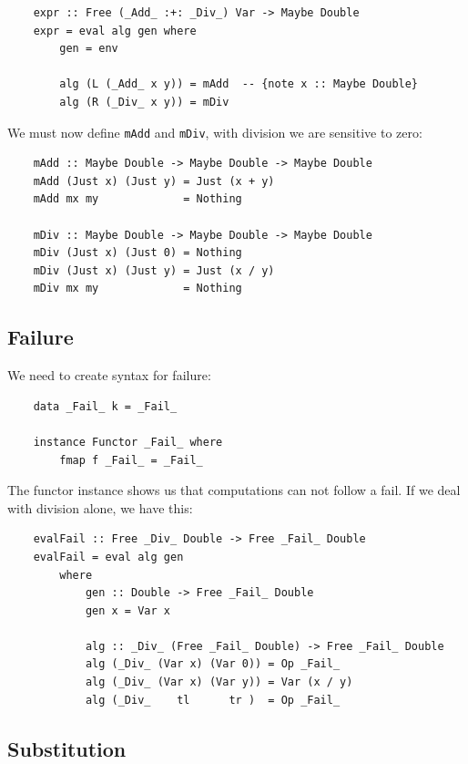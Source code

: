 \documentclass[a4paper,12pt]{article}
\theoremstyle{remark}
\begin{document}
\begin{lstlisting}
    expr :: Free (_Add_ :+: _Div_) Var -> Maybe Double
    expr = eval alg gen where
        gen = env

        alg (L (_Add_ x y)) = mAdd  -- {note x :: Maybe Double}
        alg (R (_Div_ x y)) = mDiv  \end{lstlisting}

We must now define \lstinline{mAdd} and \lstinline{mDiv}, with division we are sensitive to zero:

\begin{lstlisting}
    mAdd :: Maybe Double -> Maybe Double -> Maybe Double
    mAdd (Just x) (Just y) = Just (x + y)
    mAdd mx my             = Nothing

    mDiv :: Maybe Double -> Maybe Double -> Maybe Double
    mDiv (Just x) (Just 0) = Nothing
    mDiv (Just x) (Just y) = Just (x / y)
    mDiv mx my             = Nothing  \end{lstlisting}

\subsection{Failure}

We need to create syntax for failure:

\begin{lstlisting}
    data _Fail_ k = _Fail_

    instance Functor _Fail_ where
        fmap f _Fail_ = _Fail_  \end{lstlisting}

The functor instance shows us that computations can not follow a fail. If we deal
with division alone, we have this:

\begin{lstlisting}
    evalFail :: Free _Div_ Double -> Free _Fail_ Double
    evalFail = eval alg gen
        where
            gen :: Double -> Free _Fail_ Double
            gen x = Var x

            alg :: _Div_ (Free _Fail_ Double) -> Free _Fail_ Double
            alg (_Div_ (Var x) (Var 0)) = Op _Fail_
            alg (_Div_ (Var x) (Var y)) = Var (x / y)
            alg (_Div_    tl      tr )  = Op _Fail_  \end{lstlisting}

\subsection{Substitution}
\end{document}
